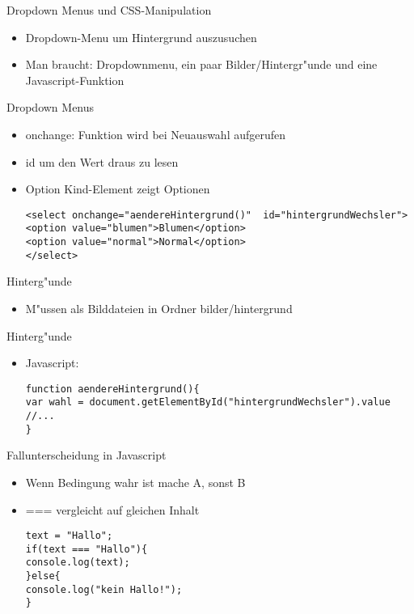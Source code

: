 \documentclass[18pt]{beamer}
\begin{document}
\begin{frame}[fragile]{Dropdown Menus und CSS-Manipulation}
\begin{itemize}
	\item Dropdown-Menu um Hintergrund auszusuchen
	\item Man braucht: Dropdownmenu, ein paar Bilder/Hintergr"unde und eine Javascript-Funktion 
\end{itemize}
\end{frame}

\begin{frame}[fragile]{Dropdown Menus}
\begin{itemize}
\item onchange: Funktion wird bei Neuauswahl aufgerufen
\item id um den Wert draus zu lesen
\item Option Kind-Element zeigt Optionen

\begin{lstlisting}
<select onchange="aendereHintergrund()"  id="hintergrundWechsler">
<option value="blumen">Blumen</option>
<option value="normal">Normal</option>
</select>
\end{lstlisting}
\end{itemize}
\end{frame}

\begin{frame}[fragile]{Hinterg"unde}
\begin{itemize}
\item M"ussen als Bilddateien in Ordner bilder/hintergrund

\end{itemize}
\end{frame}

\begin{frame}[fragile]{Hinterg"unde}
\begin{itemize}
\item Javascript:
\begin{lstlisting}
function aendereHintergrund(){
var wahl = document.getElementById("hintergrundWechsler").value
//...
}
\end{lstlisting}

\end{itemize}
\end{frame}

\begin{frame}[fragile]{Fallunterscheidung in Javascript}
\begin{itemize}
\item \glqq Wenn Bedingung wahr ist mache A, sonst B\grqq
\item === vergleicht auf gleichen Inhalt
\begin{lstlisting}
text = "Hallo";
if(text === "Hallo"){
console.log(text);
}else{
console.log("kein Hallo!");
}
\end{lstlisting}
\end{itemize}
\end{frame}
\end{document}
